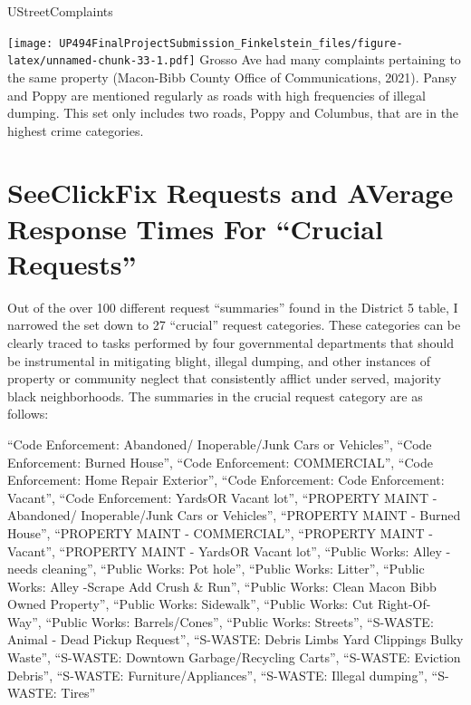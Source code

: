 \documentclass[
]{article}
\newenvironment{Shaded}{\begin{snugshade}}{\end{snugshade}}
\newcommand{\NormalTok}[1]{#1}
\begin{document}
\begin{Shaded}
\begin{Highlighting}[]
\NormalTok{UStreetComplaints}
\end{Highlighting}
\end{Shaded}

\texttt{[image: UP494FinalProjectSubmission\_Finkelstein\_files/figure-latex/unnamed-chunk-33-1.pdf]}
Grosso Ave had many complaints pertaining to the same property
(Macon-Bibb County Office of Communications, 2021). Pansy and Poppy are
mentioned regularly as roads with high frequencies of illegal dumping.
This set only includes two roads, Poppy and Columbus, that are in the
highest crime categories.

\hypertarget{seeclickfix-requests-and-average-response-times-for-crucial-requests}{%
\section{SeeClickFix Requests and AVerage Response Times For ``Crucial
Requests''}\label{seeclickfix-requests-and-average-response-times-for-crucial-requests}}

Out of the over 100 different request ``summaries'' found in the
District 5 table, I narrowed the set down to 27 ``crucial'' request
categories. These categories can be clearly traced to tasks performed by
four governmental departments that should be instrumental in mitigating
blight, illegal dumping, and other instances of property or community
neglect that consistently afflict under served, majority black
neighborhoods. The summaries in the crucial request category are as
follows:

``Code Enforcement: Abandoned/ Inoperable/Junk Cars or Vehicles'',
``Code Enforcement: Burned House'', ``Code Enforcement: COMMERCIAL'',
``Code Enforcement: Home Repair Exterior'', ``Code Enforcement: Code
Enforcement: Vacant\Abandoned\Dilapidated '', ``Code Enforcement:
Yards\Premises OR Vacant lot'', ``PROPERTY MAINT - Abandoned/
Inoperable/Junk Cars or Vehicles'', ``PROPERTY MAINT - Burned House'',
``PROPERTY MAINT - COMMERCIAL'', ``PROPERTY MAINT -
Vacant\Abandoned\Dilapidated'', ``PROPERTY MAINT - Yards\Premises OR
Vacant lot'', ``Public Works: Alley - needs cleaning'', ``Public Works:
Pot hole'', ``Public Works: Litter'', ``Public Works: Alley -Scrape Add
Crush \& Run'', ``Public Works: Clean Macon Bibb Owned Property'',
``Public Works: Sidewalk'', ``Public Works: Cut Right-Of-Way'', ``Public
Works: Barrels/Cones'', ``Public Works: Streets'', ``S-WASTE: Animal -
Dead Pickup Request'', ``S-WASTE: Debris \textbar{} Limbs \textbar{}
Yard Clippings \textbar{} Bulky Waste'', ``S-WASTE: Downtown
Garbage/Recycling Carts'', ``S-WASTE: Eviction Debris'', ``S-WASTE:
Furniture/Appliances'', ``S-WASTE: Illegal dumping'', ``S-WASTE: Tires''
\end{document}
